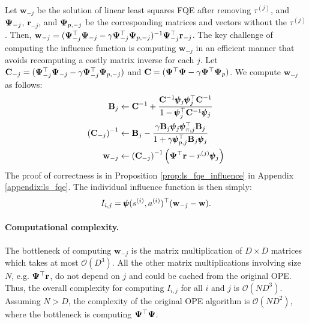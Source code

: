 \documentclass{article}
\begin{document}
Let $\mathbf{w}_{-j}$ be the solution of linear least squares FQE after removing $\tau^{(j)}$, and $\mathbf{\Psi}_{-j}$, $\mathbf{r}_{-j}$, and $\mathbf{\Psi}_{p,-j}$ be the corresponding matrices and vectors without the $\tau^{(j)}$. Then, $\mathbf{w}_{-j} = (\mathbf{\Psi}_{-j}^\top \mathbf{\Psi}_{-j} - \gamma \mathbf{\Psi}_{-j}^\top \mathbf{\Psi}_{p,-j})^{-1}\mathbf{\Psi}_{-j}^\top \mathbf{r}_{-j}$. The key challenge of computing the influence function is computing $\mathbf{w}_{-j}$ in an efficient manner that avoids recomputing a costly matrix inverse for each $j$. 
Let $\mathbf{C}_{-j} = (\mathbf{\Psi}_{-j}^\top \mathbf{\Psi}_{-j} - \gamma \mathbf{\Psi}_{-j}^\top \mathbf{\Psi}_{p,-j})$ and $\mathbf{C} = (\mathbf{\Psi}^\top \mathbf{\Psi} - \gamma \mathbf{\Psi}^\top \mathbf{\Psi}_p)$. We compute $\mathbf{w}_{-j}$ as follows:
\begin{align}
    \mathbf{B}_{j} &\leftarrow \mathbf{C}^{-1} + \frac{\mathbf{C}^{-1} \pmb{\psi}_j \pmb{\psi}_j^\top \mathbf{C}^{-1}}{1- \pmb{\psi}_{j}^{\top}\mathbf{C}^{-1}\pmb{\psi}_{j}}\\
    \left(\mathbf{C}_{-j}\right)^{-1} &\leftarrow \mathbf{B}_{j} - \frac{\gamma \mathbf{B}_{j} \pmb{\psi}_j \pmb{\psi}_{\pi,j}^\top \mathbf{B}_{j}}{1+ \gamma \pmb{\psi}_{p,j}^{\top}\mathbf{B}_{j}\pmb{\psi}_{j}} \\
    \mathbf{w}_{-j} &\leftarrow \left(\mathbf{C}_{-j}\right)^{-1}\left( \mathbf{\Psi}^\top \mathbf{r} - r^{(j)} \pmb{\psi}_j \right) 
\end{align}
The proof of correctness is in Proposition \ref{prop:ls_fqe_influence} in Appendix \ref{appendix:ls_fqe}. The individual influence function is then simply:
\begin{align}
    I_{i,j} = \pmb{\psi}(s^{(i)},a^{(i)})^\top (\mathbf{w}_{-j} - \mathbf{w}).
\end{align}

\paragraph{Computational complexity.} The bottleneck of computing $\mathbf{w}_{-j}$ is the matrix multiplication of $D \times D$ matrices which takes at most $\mathcal{O}(D^{3})$. All the other matrix multiplications involving size $N$, e.g. $\mathbf{\Psi}^\top \mathbf{r}$, do not depend on $j$ and could be cached from the original OPE. Thus, the overall complexity for computing $I_{i,j}$ for all $i$ and $j$ is $\mathcal{O}(ND^{3})$. Assuming $N>D$, the complexity of the original OPE algorithm is $\mathcal{O}(ND^2)$, where the bottleneck is computing $\mathbf{\Psi}^\top \mathbf{\Psi}$.
\end{document}
